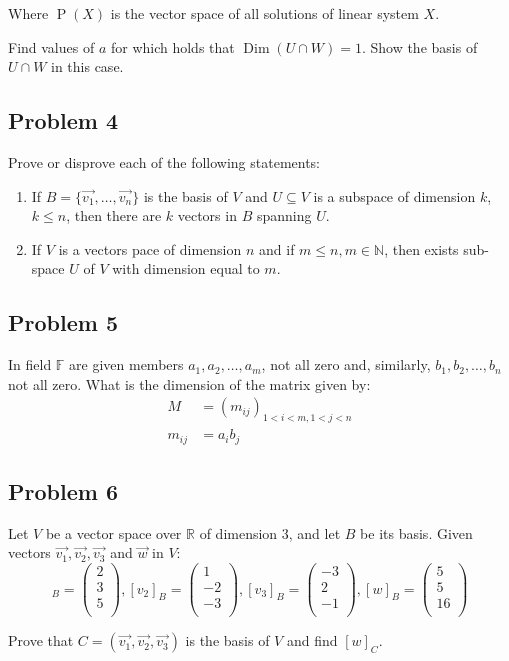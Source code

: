 \documentclass[fleqn]{article}
\DeclareMathOperator{\Solutions}{P}
\DeclareMathOperator{\Dim}{Dim}
\begin{document}
Where $\Solutions(X)$ is the vector space of all solutions of linear system $X$.

Find values of $a$ for which holds that $\Dim(U \cap W)=1$. Show the basis of
$U \cap W$ in this case.
\subsection{Problem 4}
\label{sec-1-4}

Prove or disprove each of the following statements:

\begin{enumerate}
\item If $B=\{\vec{v_1}, \ldots, \vec{v_n}\}$ is the basis of $V$ and $U \subseteq V$ is
a subspace of dimension $k$, $k \leq n$, then there are $k$ vectors in $B$ spanning
$U$.
\item If $V$ is a vectors pace of dimension $n$ and if $m \leq n, m \in \mathbb{N}$, then
exists sub-space $U$ of $V$ with dimension equal to $m$.
\end{enumerate}
\subsection{Problem 5}
\label{sec-1-5}

In field $\mathbb{F}$ are given members $a_1, a_2, \ldots, a_m$, not all zero and,
similarly, $b_1, b_2, \ldots, b_n$ not all zero.  What is the dimension of the
matrix given by:
\begin{align*}
  M     &= (m_{ij})_{1<i<m, 1<j<n} \\
  m_{ij} &= a_ib_j
\end{align*}
\subsection{Problem 6}
\label{sec-1-6}

Let $V$ be a vector space over $\mathbb{R}$ of dimension 3, and let $B$ be its basis.
Given vectors $\vec{v_1}, \vec{v_2}, \vec{v_3}$ and $\vec{w}$ in $V$:
\begin{equation*}
  [v_1]_B= \begin{pmatrix}  2 \\  3 \\  5 \\ \end{pmatrix},
  [v_2]_B= \begin{pmatrix}  1 \\ -2 \\ -3 \\ \end{pmatrix},
  [v_3]_B= \begin{pmatrix} -3 \\  2 \\ -1 \\ \end{pmatrix},
  [w]_B=   \begin{pmatrix}  5 \\  5 \\ 16 \\ \end{pmatrix}
\end{equation*}

Prove that $C=(\vec{v_1}, \vec{v_2}, \vec{v_3})$ is the basis of $V$ and find $[w]_C$.
\end{document}
